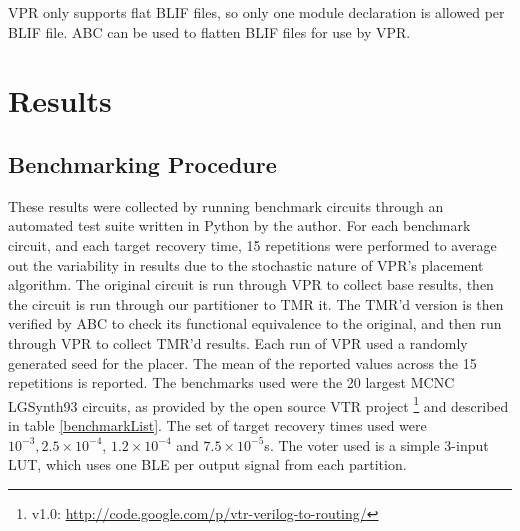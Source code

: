 \documentclass[12pt,final,oneside]{dwThesis} %
\begin{document}
   \gls{VPR} only supports flat \gls{BLIF} files, so only one module
   declaration is allowed per \gls{BLIF} file. \gls{ABC} can be used to flatten
   \gls{BLIF} files for use by \gls{VPR}.


   \chapter{Results}

   \section{Benchmarking Procedure}
   These results were
   collected by running benchmark circuits through an automated test suite
   written in Python by the author. For each benchmark circuit, and each target
   recovery time, 15 repetitions were performed to average out the variability
   in results due to the stochastic nature of \gls{VPR}'s placement algorithm.
   The original circuit is run through VPR to collect base results, then the
   circuit is run through our partitioner to TMR it. The TMR'd version is then
   verified by \gls{ABC} to check its functional equivalence to the original,
   and then run through VPR to collect TMR'd results. Each run of VPR used a
   randomly generated seed for the placer.  The mean of the reported values
   across the 15 repetitions is reported.  The benchmarks used were the 20
   largest \gls{MCNC} LGSynth93 circuits, as provided by the open source
   \gls{VTR} project \footnote{v1.0: \url{http://code.google.com/p/vtr-verilog-to-routing/}} and described in table
   \ref{benchmarkList}.  The set of target recovery times used were $10^{-3},
   2.5\times10^{-4}$, $1.2\times10^{-4}$ and $7.5\times10^{-5}$s.  The voter used is a simple
   3-input \gls{LUT}, which uses one \gls{BLE} per output signal from each
   partition.
\end{document}
